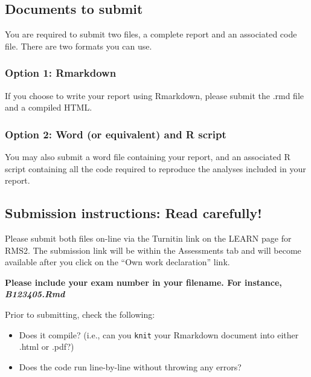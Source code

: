 \documentclass[
]{article}
\providecommand{\tightlist}{%
  \setlength{\itemsep}{0pt}\setlength{\parskip}{0pt}}
\begin{document}
\hypertarget{documents-to-submit}{%
\subsection{Documents to submit}\label{documents-to-submit}}

You are required to submit two files, a complete report and an
associated code file. There are two formats you can use.

\hypertarget{option-1-rmarkdown}{%
\subsubsection{Option 1: Rmarkdown}\label{option-1-rmarkdown}}

If you choose to write your report using Rmarkdown, please submit the
.rmd file and a compiled HTML.

\hypertarget{option-2-word-or-equivalent-and-r-script}{%
\subsubsection{Option 2: Word (or equivalent) and R
script}\label{option-2-word-or-equivalent-and-r-script}}

You may also submit a word file containing your report, and an
associated R script containing all the code required to reproduce the
analyses included in your report.

\hypertarget{submission-instructions-read-carefully}{%
\subsection{Submission instructions: Read
carefully!}\label{submission-instructions-read-carefully}}

Please submit both files on-line via the Turnitin link on the LEARN page
for RMS2. The submission link will be within the Assessments tab and
will become available after you click on the ``Own work declaration''
link.

\textbf{Please include your exam number in your filename. For instance,
\emph{B123405.Rmd}}

Prior to submitting, check the following:

\begin{itemize}
\tightlist
\item
  Does it compile? (i.e., can you \texttt{knit} your Rmarkdown document
  into either .html or .pdf?)\\
\item
  Does the code run line-by-line without throwing any errors?
\end{itemize}
\end{document}
